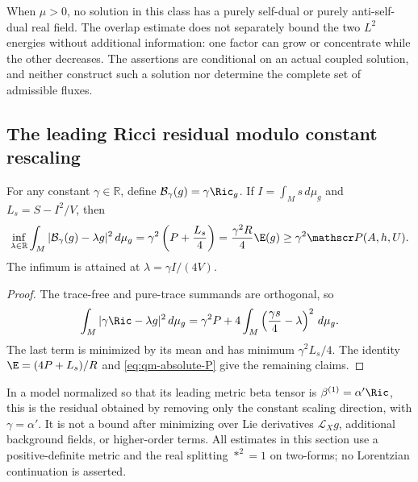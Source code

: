 When $\mu>0$, no solution in this class has a purely self-dual or purely
anti-self-dual real field.  The overlap estimate does not separately
bound the two $L^2$ energies without additional information: one factor
can grow or concentrate while the other decreases.  The assertions are
conditional on an actual coupled solution, and neither construct such
a solution nor determine the complete set of admissible fluxes.

\subsection{The leading Ricci residual modulo constant rescaling}

\begin{proposition}\label{prop:qm-ricci-residual}
For any constant $\gamma\in\mathbb R$, define
$\mathcal B_\gamma(g)=\gamma\Ric_g$.  If
$I=\int_Ms\,d\mu_g$ and $L_s=S-I^2/V$, then
\begin{equation}\label{eq:qm-residual}
 \inf_{\lambda\in\mathbb R}
   \int_M|\mathcal B_\gamma(g)-\lambda g|^2\,d\mu_g
 =\gamma^2\left(P+\frac{L_s}{4}\right)
 =\frac{\gamma^2R}{4}\E(g)
 \ge\gamma^2\mathscr P(A,h,U).
\end{equation}
The infimum is attained at $\lambda=\gamma I/(4V)$.
\end{proposition}

\begin{proof}
The trace-free and pure-trace summands are orthogonal, so
\[
 \int_M|\gamma\Ric-\lambda g|^2\,d\mu_g
 =\gamma^2P+4\int_M\left(\frac{\gamma s}{4}-\lambda\right)^2\,d\mu_g.
\]
The last term is minimized by its mean and has minimum
$\gamma^2L_s/4$.  The identity
$\E=(4P+L_s)/R$ and \eqref{eq:qm-absolute-P} give the remaining claims.
\end{proof}

In a model normalized so that its leading metric beta tensor is
$\beta^{(1)}=\alpha'\Ric$, this is the residual obtained by removing
only the constant scaling direction, with $\gamma=\alpha'$.
It is not a bound after minimizing over Lie derivatives
$\mathcal L_Xg$, additional background fields, or higher-order terms.
All estimates in this section use a positive-definite metric and the
real splitting $*^2=1$ on two-forms; no Lorentzian continuation is
asserted.
